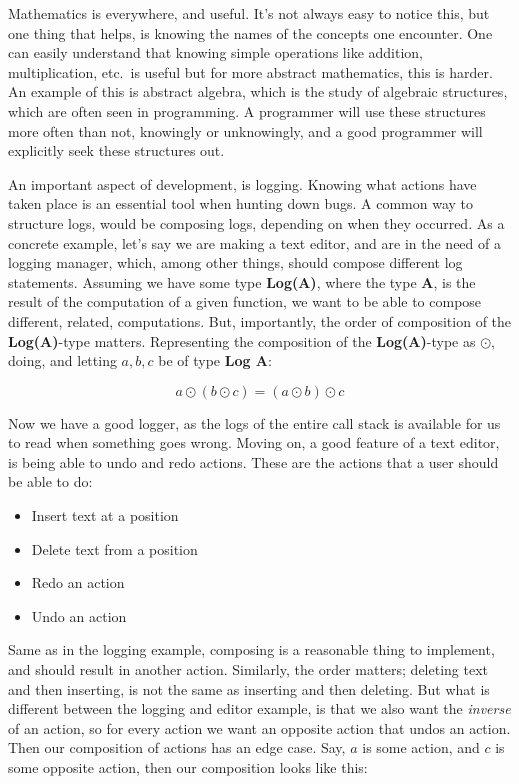 Mathematics is everywhere, and useful. It's not always easy to notice this, but
one thing that helps, is knowing the names of the concepts one encounter. One
can easily understand that knowing simple operations like addition,
multiplication, etc.\ is useful but for more abstract mathematics, this is
harder. An example of this is abstract algebra, which is the study of algebraic
structures, which are often seen in programming. A programmer will use these
structures more often than not, knowingly or unknowingly, and a good programmer
will explicitly seek these structures out.

An important aspect of development, is logging. Knowing what actions have taken
place is an essential tool when hunting down bugs. A common way to structure
logs, would be composing logs, depending on when they occurred. As a concrete
example, let's say we are making a text editor, and are in the need of a logging
manager, which, among other things, should compose different log statements.
Assuming we have some type \textbf{Log(A)}, where the type \textbf{A}, is the
result of the computation of a given function, we want to be able to compose
different, related, computations. But, importantly, the order of composition
of the \textbf{Log(A)}-type matters. Representing the composition of the
\textbf{Log(A)}-type as $\odot$, doing, and letting $a, b, c$ be of type
\textbf{Log A}:

\begin{definition} \label{def:logComp}
  \begin{equation}
    a \odot \left ( b \odot c \right ) = \left ( a \odot b \right ) \odot c
  \end{equation}
\end{definition}

Now we have a good logger, as the logs of the entire call stack is available for
us to read when something goes wrong. Moving on, a good feature of a text
editor, is being able to undo and redo actions. These are the actions that a
user should be able to do:

\begin{itemize}[H]
  \item Insert text at a position
  \item Delete text from a position
  \item Redo an action
  \item Undo an action
\end{itemize}

Same as in the logging example, composing is a reasonable thing to implement,
and should result in another action. Similarly, the order matters; deleting text
and then inserting, is not the same as inserting and then deleting. But what is
different between the logging and editor example, is that we also want the
\textit{inverse} of an action, so for every action we want an opposite action
that undos an action. Then our composition of actions has an edge case. Say, $a$
is some action, and $c$ is some opposite action, then our composition looks like
this:

